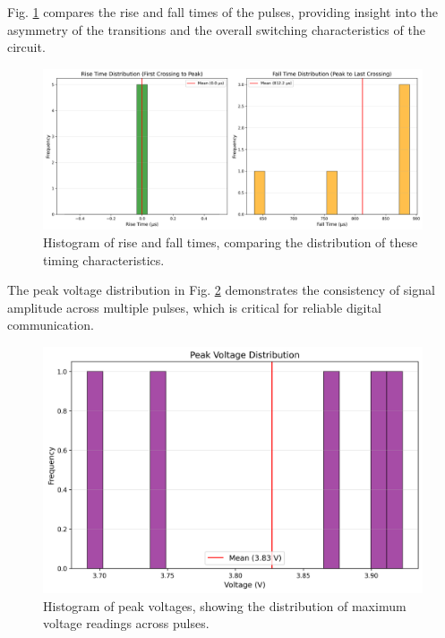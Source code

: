 \documentclass[conference]{IEEEtran}
\begin{document}
Fig. \ref{fig:waveform_timing_hist} compares the rise and fall times of the pulses, providing insight into the asymmetry of the transitions and the overall switching characteristics of the circuit.

\begin{figure}[htbp]
    \centering
    \includegraphics[width=\linewidth]{data/waveform_session_2025-05-09_1445/plots/waveform_timing_hist.png}
    \caption{Histogram of rise and fall times, comparing the distribution of these timing characteristics.}
    \label{fig:waveform_timing_hist}
\end{figure}

The peak voltage distribution in Fig. \ref{fig:waveform_voltage_hist} demonstrates the consistency of signal amplitude across multiple pulses, which is critical for reliable digital communication.

\begin{figure}[htbp]
    \centering
    \includegraphics[width=\linewidth]{data/waveform_session_2025-05-09_1445/plots/waveform_voltage_hist.png}
    \caption{Histogram of peak voltages, showing the distribution of maximum voltage readings across pulses.}
    \label{fig:waveform_voltage_hist}
\end{figure}
\end{document}
